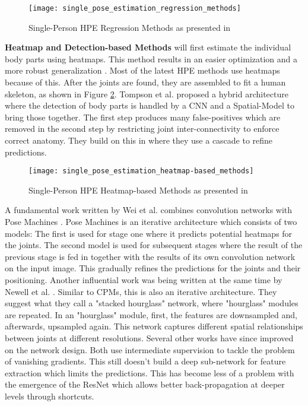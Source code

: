 \begin{figure}[h]
	\centering
	\texttt{[image: single\_pose\_estimation\_regression\_methods]}%
	\caption{Single-Person HPE Regression Methods as presented in \cite{Zheng2012}}
	\label{fig:single_pose_estimation_regression_methods}
\end{figure}

\textbf{Heatmap and Detection-based Methods} will first estimate the individual body parts using heatmaps.
This method results in an easier optimization and a more robust generalization \cite{chen2022}.
Most of the latest HPE methods use heatmaps because of this.
After the joints are found, they are assembled to fit a human skeleton, as shown in Figure \ref{fig:single_pose_estimation_heatmap-based_methods}.
Tompson et al. \cite{TompsonJLB14} proposed a hybrid architecture where the detection of body parts is handled by a CNN and a Spatial-Model to bring those together.
The first step produces many false-positives which are removed in the second step by restricting joint inter-connectivity to enforce correct anatomy.
They build on this in \cite{Tompson2015} where they use a cascade to refine predictions.

\begin{figure}[h]
	\centering
	\texttt{[image: single\_pose\_estimation\_heatmap-based\_methods]}%
	\caption{Single-Person HPE Heatmap-based Methods as presented in \cite{Zheng2012}}
	\label{fig:single_pose_estimation_heatmap-based_methods}
\end{figure}

A fundamental work written by Wei et al. \cite{Wei2016} combines convolution networks with Pose Machines \cite{Ramakrishna2014}.
Pose Machines is an iterative architecture which consists of two models:
The first is used for stage one where it predicts potential heatmaps for the joints.
The second model is used for subsequent stages where the result of the previous stage is fed in together with the results of its own convolution network on the input image. 
This gradually refines the predictions for the joints and their positioning.
Another influential work was being written at the same time by Newell et al. \cite{Newell2016}.
Similar to \gls{CPMs}, this is also an iterative architecture.
They suggest what they call a "stacked hourglass" network, where "hourglass" modules are repeated.
In an "hourglass" module, first, the features are downsampled and, afterwards, upsampled again.
This network captures different spatial relationships between joints at different resolutions.
Several other works \cite{Yang2017, Chou17} have since improved on the network design.
Both use intermediate supervision to tackle the problem of vanishing gradients.
This still doesn't build a deep sub-network for feature extraction which limits the predictions.
This has become less of a problem with the emergence of the \gls{ResNet} \cite{He2015} which allows better back-propagation at deeper levels through shortcuts.

